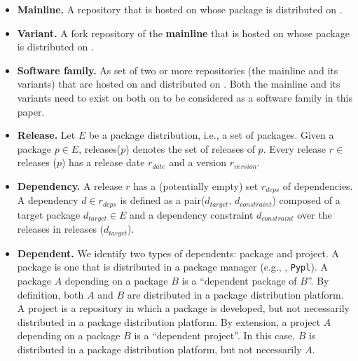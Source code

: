\begin{itemize}
    \item \textbf{Mainline.} A repository that is hosted on \scp 
    whose package is distributed on \np.

    \item \textbf{Variant.} A fork repository of the \textbf{mainline} that is hosted on \scp
    whose package is distributed on \np.

    \item \textbf{Software family.} As set of two or more repositories (the mainline and its variants) that are hosted on \scp
    and distributed on \np.
    Both the mainline and its variants need to exist on both on \np to be considered as a software family in this paper.

    
    \item \textbf{Release.} Let $E$ be a package distribution, i.e., a set of packages. Given a package $p\in E$, releases($p$) denotes the set of releases of $p$. Every release $r\in$ releases ($p$) has a release date $r_{date}$ and a version $r_{version}$.

     \item \textbf{Dependency.} A release $r$ has a (potentially empty) set $r_{deps}$ of dependencies. A dependency $d \in r_{deps}$ is defined as a pair($d_{target}$, $d_{constraint}$) composed of a target package $d_{target} \in E$ and a dependency constraint $d_{constraint}$ over the releases in releases ($d_{target}$).

    \item \textbf{Dependent.} We identify two types of dependents: package and project. A package is one that is distributed in a package manager (e.g., \np, \texttt{Pypl}). A package $A$ depending on a package $B$ is a ``dependent package of $B$''. By definition, both $A$ and $B$ are distributed in a package distribution platform. A project is a repository in which a package is developed, but not necessarily distributed in a package distribution platform. By extension, a project $A$ depending on a package $B$ is a ``dependent project''. In this case, $B$ is distributed in a package distribution platform, but not necessarily $A$.

\end{itemize}

